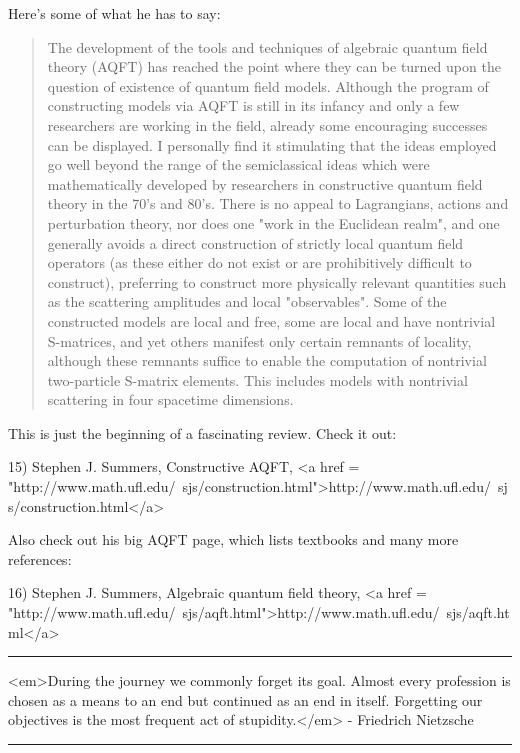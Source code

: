 Here's some of what he has to say:

\begin{quote}
The development of the tools and techniques of algebraic quantum field
theory (AQFT) has reached the point where they can be turned upon the
question of existence of quantum field models. Although the program of
constructing models via AQFT is still in its infancy and only a few
researchers are working in the field, already some encouraging
successes can be displayed. I personally find it stimulating that the
ideas employed go well beyond the range of the semiclassical ideas
which were mathematically developed by researchers in constructive
quantum field theory in the 70's and 80's. There is no appeal to
Lagrangians, actions and perturbation theory, nor does one "work in
the Euclidean realm", and one generally avoids a direct construction
of strictly local quantum field operators (as these either do not
exist or are prohibitively difficult to construct), preferring to
construct more physically relevant quantities such as the scattering
amplitudes and local "observables". Some of the constructed models are
local and free, some are local and have nontrivial S-matrices, and yet
others manifest only certain remnants of locality, although these
remnants suffice to enable the computation of nontrivial two-particle
S-matrix elements. This includes models with nontrivial scattering in
four spacetime dimensions.
\end{quote}

This is just the beginning of a fascinating review.
Check it out:

15) Stephen J. Summers, Constructive AQFT, 
<a href = "http://www.math.ufl.edu/~sjs/construction.html">http://www.math.ufl.edu/~sjs/construction.html</a>

Also check out his big AQFT page, which lists textbooks and
many more references:

16) Stephen J. Summers, Algebraic quantum field theory,
<a href = "http://www.math.ufl.edu/~sjs/aqft.html">http://www.math.ufl.edu/~sjs/aqft.html</a>



\par\noindent\rule{\textwidth}{0.4pt}

<em>During the journey we commonly forget its goal. Almost every
profession is chosen as a means to an end but continued as an end in
itself.  Forgetting our objectives is the most frequent act of
stupidity.</em> - Friedrich Nietzsche

\par\noindent\rule{\textwidth}{0.4pt}


